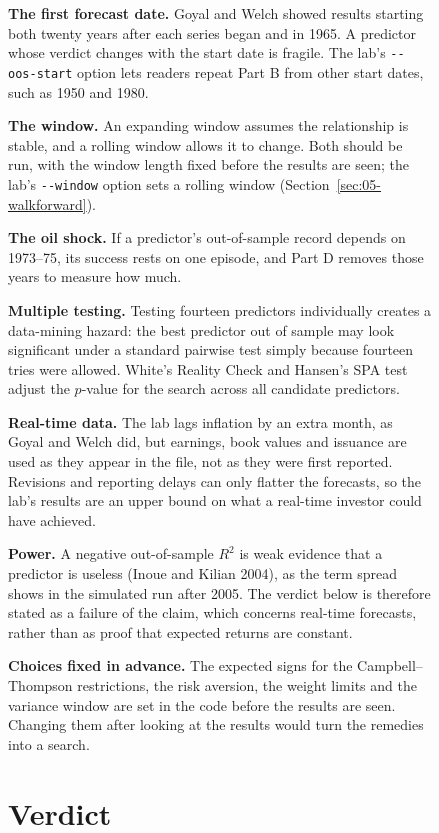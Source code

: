 \begin{figure}[htbp]
\textbf{The first forecast date.} Goyal and Welch showed results starting both twenty years after each series began and in 1965. A predictor whose verdict changes with the start date is fragile. The lab's \texttt{-{}-oos-start} option lets readers repeat Part B from other start dates, such as 1950 and 1980.

\textbf{The window.} An expanding window assumes the relationship is stable, and a rolling window allows it to change. Both should be run, with the window length fixed before the results are seen; the lab's \texttt{-{}-window} option sets a rolling window (Section~\ref{sec:05-walkforward}).

\textbf{The oil shock.} If a predictor's out-of-sample record depends on 1973--75, its success rests on one episode, and Part D removes those years to measure how much.

\textbf{Multiple testing.} Testing fourteen predictors individually creates a data-mining hazard: the best predictor out of sample may look significant under a standard pairwise test simply because fourteen tries were allowed. White's Reality Check and Hansen's SPA test adjust the $p$-value for the search across all candidate predictors.

\textbf{Real-time data.} The lab lags inflation by an extra month, as Goyal and Welch did, but earnings, book values and issuance are used as they appear in the file, not as they were first reported. Revisions and reporting delays can only flatter the forecasts, so the lab's results are an upper bound on what a real-time investor could have achieved.

\textbf{Power.} A negative out-of-sample $R^2$ is weak evidence that a predictor is useless (Inoue and Kilian 2004), as the term spread shows in the simulated run after 2005. The verdict below is therefore stated as a failure of the claim, which concerns real-time forecasts, rather than as proof that expected returns are constant.

\textbf{Choices fixed in advance.} The expected signs for the Campbell--Thompson restrictions, the risk aversion, the weight limits and the variance window are set in the code before the results are seen. Changing them after looking at the results would turn the remedies into a search.

\section{Verdict}
\label{sec:05-verdict}


\end{figure}
